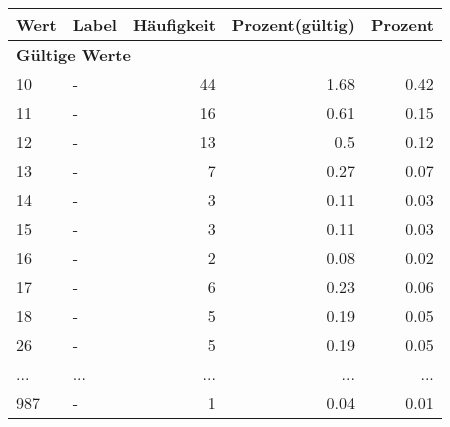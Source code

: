      \begin{longtable}{lXrrr}
     \toprule
     \textbf{Wert} & \textbf{Label} & \textbf{Häufigkeit} & \textbf{Prozent(gültig)} & \textbf{Prozent} \\
     \endhead
     \midrule
     \multicolumn{5}{l}{\textbf{Gültige Werte}}\\
        10 & \multicolumn{1}{X}{-} & %
          \num{44} &
          \num[round-mode=places,round-precision=2]{1,68} &
          \num[round-mode=places,round-precision=2]{0,42} \\
        11 & \multicolumn{1}{X}{-} & %
          \num{16} &
          \num[round-mode=places,round-precision=2]{0,61} &
          \num[round-mode=places,round-precision=2]{0,15} \\
        12 & \multicolumn{1}{X}{-} & %
          \num{13} &
          \num[round-mode=places,round-precision=2]{0,5} &
          \num[round-mode=places,round-precision=2]{0,12} \\
        13 & \multicolumn{1}{X}{-} & %
          \num{7} &
          \num[round-mode=places,round-precision=2]{0,27} &
          \num[round-mode=places,round-precision=2]{0,07} \\
        14 & \multicolumn{1}{X}{-} & %
          \num{3} &
          \num[round-mode=places,round-precision=2]{0,11} &
          \num[round-mode=places,round-precision=2]{0,03} \\
        15 & \multicolumn{1}{X}{-} & %
          \num{3} &
          \num[round-mode=places,round-precision=2]{0,11} &
          \num[round-mode=places,round-precision=2]{0,03} \\
        16 & \multicolumn{1}{X}{-} & %
          \num{2} &
          \num[round-mode=places,round-precision=2]{0,08} &
          \num[round-mode=places,round-precision=2]{0,02} \\
        17 & \multicolumn{1}{X}{-} & %
          \num{6} &
          \num[round-mode=places,round-precision=2]{0,23} &
          \num[round-mode=places,round-precision=2]{0,06} \\
        18 & \multicolumn{1}{X}{-} & %
          \num{5} &
          \num[round-mode=places,round-precision=2]{0,19} &
          \num[round-mode=places,round-precision=2]{0,05} \\
        26 & \multicolumn{1}{X}{-} & %
          \num{5} &
          \num[round-mode=places,round-precision=2]{0,19} &
          \num[round-mode=places,round-precision=2]{0,05} \\
       ... & ... & ... & ... & ... \\
        987 & \multicolumn{1}{X}{-} & %
          \num{1} &
          \num[round-mode=places,round-precision=2]{0,04} &
          \num[round-mode=places,round-precision=2]{0,01} \\


\end{longtable}
